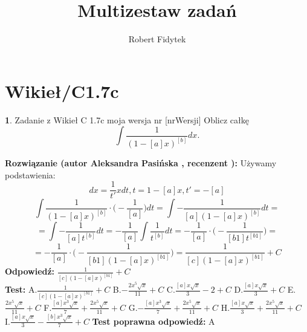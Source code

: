 \documentclass[12pt, a4paper]{article}
\title{Multizestaw zadań}
\author{Robert Fidytek}
\date{}
\theoremstyle{definition} %
\newtheorem{zad}{}
\newcommand{\kategoria}[1]{\section{#1}} %
\newcommand{\zadStart}[1]{\begin{zad}#1\newline} %
\newcommand{\zadStop}{\end{zad}}   %
\newcommand{\rozwStart}[2]{\noindent \textbf{Rozwiązanie (autor #1 , recenzent #2): }\newline} %
\newcommand{\rozwStop}{\newline}                                            %
\newcommand{\odpStart}{\noindent \textbf{Odpowiedź:}\newline}    %
\newcommand{\odpStop}{\newline}                                             %
\newcommand{\testStart}{\noindent \textbf{Test:}\newline} %
\newcommand{\testStop}{\newline} %
\newcommand{\kluczStart}{\noindent \textbf{Test poprawna odpowiedź:}\newline} %
\newcommand{\kluczStop}{\newline} %
\begin{document}
\maketitle


\kategoria{Wikieł/C1.7c}
\zadStart{Zadanie z Wikieł C 1.7c moja wersja nr [nrWersji]}
Oblicz całkę $$\int \frac{1}{(1-[a]x)^{[b]}}dx.$$
\zadStop
\rozwStart{Aleksandra Pasińska}{}
Używamy podstawienia:
$$dx=\frac{1}{t'}xdt,t=1-[a]x, t'=-[a]$$
$$\int \frac{1}{(1-[a]x)^{[b]}}\cdot \bigg(-\frac{1}{[a]}\bigg)dt=\int -\frac{1}{[a](1-[a]x)^{[b]}}dt=$$
$$=\int -\frac{1}{[a]t^{[b]}}dt=-\frac{1}{[a]}\int \frac{1}{t^{[b]}}dt=-\frac{1}{[a]}\cdot \bigg(-\frac{1}{[b1]t^{[b1]}}\bigg)=$$
$$=-\frac{1}{[a]}\cdot \bigg(-\frac{1}{[b1](1-[a]x)^{[b1]}}\bigg)=\frac{1}{[c](1-[a]x)^{[b1]}}+C$$
\rozwStop
\odpStart
$\frac{1}{[c](1-[a]x)^{[b1]}}+C$\\
\odpStop
\testStart
A.$\frac{1}{[c](1-[a]x)^{[b1]}}+C$
B.$-\frac{2x^5\sqrt{x}}{11}+C$
C.$\frac{[a]x\sqrt{x}}{3}-2+C$
D.$\frac{[a]x\sqrt{x}}{3}+C$
E.$\frac{2x^5\sqrt{x}}{11}+C$
F.$\frac{[a]x^3\sqrt{x}}{7}+\frac{2x^5\sqrt{x}}{11}+C$
G.$-\frac{[a]x^3\sqrt{x}}{7}+\frac{2x^5\sqrt{x}}{11}+C$
H.$\frac{[a]x\sqrt{x}}{3}+\frac{2x^5\sqrt{x}}{11}+C$
I.$\frac{[a]x\sqrt{x}}{3}-\frac{[b]x^3\sqrt{x}}{7}+C$
\testStop
\kluczStart
A
\kluczStop
\end{document}
